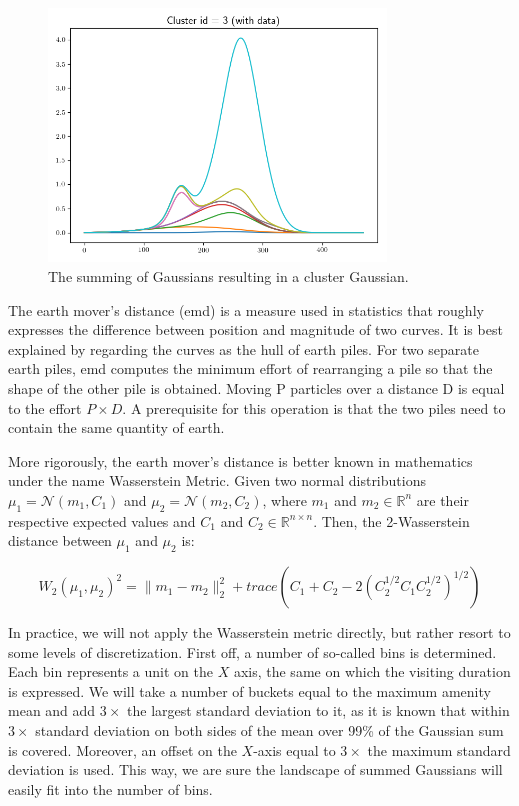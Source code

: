 \begin{figure}[!ht]
	\centering
	\includegraphics[width=0.8\textwidth]{graphics/emd_gaussian_addition3.png}
	\caption{The summing of Gaussians resulting in a cluster Gaussian.}
	\label{fig:gaussian}
\end{figure}

The earth mover's distance (emd) is a measure used in statistics that roughly expresses the difference between position and magnitude of two curves.
It is best explained by regarding the curves as the hull of earth piles.
For two separate earth piles, emd computes the minimum effort of rearranging a pile so that the shape of the other pile is obtained.
Moving P particles over a distance D is equal to the effort $P \times D$.
A prerequisite for this operation is that the two piles need to contain the same quantity of earth.

More rigorously, the earth mover's distance is better known in mathematics under the name Wasserstein Metric.
Given two normal distributions $\mu_1=\mathcal{N}(m_1,C_1)$ and $\mu_2=\mathcal{N}(m_2,C_2)$, where $m_1$ and $m_2 \in \mathbb{R}^{n}$ are their respective expected values and $C_1$ and $C_2 \in \mathbb{R}^{n\times n}$.
Then, the 2-Wasserstein distance between $\mu_1$ and $\mu_2$ is:

\begin{equation}
W_2(\mu_1,\mu_2)^2={\lVert}m_1-m_2{\rVert}^2_2+trace(C_1+C_2-2(C_2^{1/2}C_1C_2^{1/2})^{1/2})
\end{equation}

In practice, we will not apply the Wasserstein metric directly, but rather resort to some levels of discretization.
First off, a number of so-called bins is determined.
Each bin represents a unit on the $X$ axis, the same on which the visiting duration is expressed.
We will take a number of buckets equal to the maximum amenity mean and add $3\times$ the largest standard deviation to it, as it is known that within $3\times$ standard deviation on both sides of the mean over 99\% of the Gaussian sum is covered.
Moreover, an offset on the $X$-axis equal to $3\times$ the maximum standard deviation is used.
This way, we are sure the landscape of summed Gaussians will easily fit into the number of bins.

